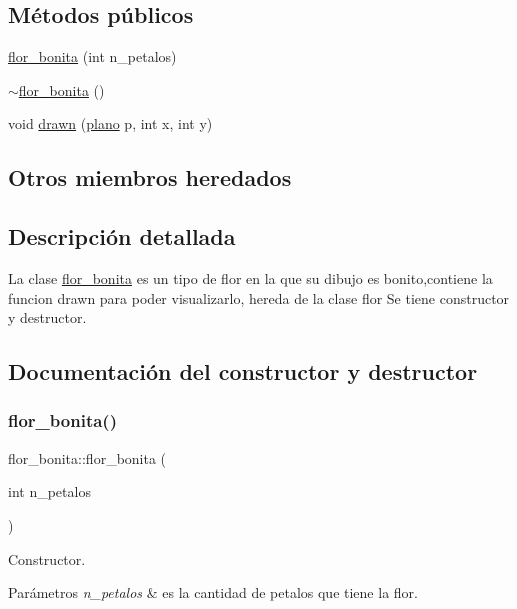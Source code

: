 \subsection*{Métodos públicos}
\begin{DoxyCompactItemize}
\item 
\hyperlink{classflor__bonita_a650112410a675dce9b0e4c91d6182265}{flor\+\_\+bonita} (int n\+\_\+petalos)
\item 
\hyperlink{classflor__bonita_a56aa0024af8048194fa6400832ef7f97}{$\sim$flor\+\_\+bonita} ()
\item 
void \hyperlink{classflor__bonita_a25162281fab0a1118962f1db69b4fa81}{drawn} (\hyperlink{classplano}{plano} p, int x, int y)
\end{DoxyCompactItemize}
\subsection*{Otros miembros heredados}


\subsection{Descripción detallada}
La clase \hyperlink{classflor__bonita}{flor\+\_\+bonita} es un tipo de flor en la que su dibujo es bonito,contiene la funcion drawn para poder visualizarlo, hereda de la clase flor  Se tiene constructor y destructor. 

\subsection{Documentación del constructor y destructor}
\mbox{\label{classflor__bonita_a650112410a675dce9b0e4c91d6182265}} 
\subsubsection{\texorpdfstring{flor\+\_\+bonita()}{flor\_bonita()}}
{\footnotesize\ttfamily flor\+\_\+bonita\+::flor\+\_\+bonita (\begin{DoxyParamCaption}\item[{int}]{n\+\_\+petalos }\end{DoxyParamCaption})}

Constructor. 
\begin{DoxyParams}{Parámetros}
{\em n\+\_\+petalos} & es la cantidad de petalos que tiene la flor. \\
\hline
\end{DoxyParams}
\mbox{\label{classflor__bonita_a56aa0024af8048194fa6400832ef7f97}} 
